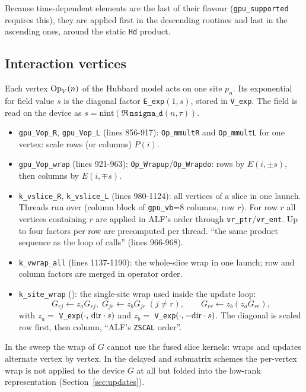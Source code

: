 Because time-dependent elements are the last of their flavour (\texttt{gpu\_supported} requires this), they are applied first in the descending routines and last in the ascending ones, around the static \texttt{Hd} product.

\subsection{Interaction vertices}

Each vertex $\mathrm{Op}_V(n)$ of the Hubbard model acts on one site $p_n$. Its exponential for field value $s$ is the diagonal factor \texttt{E\_exp}$(1,s)$, stored in \texttt{V\_exp}. The field is read on the device as $s=\mathrm{nint}(\Re\,\texttt{nsigma\_d}(n,\tau))$.

\begin{itemize}
\item \texttt{gpu\_Vop\_R}, \texttt{gpu\_Vop\_L} (lines 856-917): \texttt{Op\_mmultR} and \texttt{Op\_mmultL} for one vertex: scale rows (or columns) $P(i)$.
\item \texttt{gpu\_Vop\_wrap} (lines 921-963): \texttt{Op\_Wrapup}/\texttt{Op\_Wrapdo}: rows by $E(i,\pm s)$, then columns by $E(i,\mp s)$.
\item \texttt{k\_vslice\_R}, \texttt{k\_vslice\_L} (lines 980-1124): all vertices of a slice in one launch. Threads run over (column block of \texttt{gpu\_vb}=8 columns, row $r$). For row $r$ all vertices containing $r$ are applied in ALF's order through \texttt{vr\_ptr}/\texttt{vr\_ent}. Up to four factors per row are precomputed per thread. ``the same product sequence as the loop of calls'' (lines 966-968).
\item \texttt{k\_vwrap\_all} (lines 1137-1190): the whole-slice wrap in one launch; row and column factors are merged in operator order.
\item \texttt{k\_site\_wrap} (): the single-site wrap used inside the update loop:
\begin{equation}
G_{rj}\leftarrow z_a G_{rj},\; G_{jr}\leftarrow z_b G_{jr}\;(j\ne r),\qquad G_{rr}\leftarrow z_b(z_a G_{rr}),
\end{equation}
with $z_a=$ \texttt{V\_exp}$(\cdot,\,{\rm dir}\cdot s)$ and $z_b=$ \texttt{V\_exp}$(\cdot,-{\rm dir}\cdot s)$. The diagonal is scaled row first, then column, ``ALF's \texttt{ZSCAL} order''.
\end{itemize}
In the sweep the wrap of $G$ cannot use the fused slice kernels: wraps and updates alternate vertex by vertex. In the delayed and submatrix schemes the per-vertex wrap is not applied to the device $G$ at all but folded into the low-rank representation (Section~\ref{sec:updates}).

